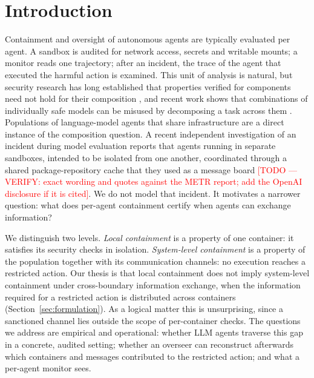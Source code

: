 \documentclass[11pt, a4paper]{article}
\newcommand{\todo}[1]{\textcolor{red}{[TODO --- #1]}}
\theoremstyle{definition}
\begin{document}
\section{Introduction}

Containment and oversight of autonomous agents are typically evaluated per agent. A sandbox is audited for network access, secrets and writable mounts; a monitor reads one trajectory; after an incident, the trace of the agent that executed the harmful action is examined. This unit of analysis is natural, but security research has long established that properties verified for components need not hold for their composition \citep{mccullough1987, mantel2002}, and recent work shows that combinations of individually safe models can be misused by decomposing a task across them \citep{jones2025combinations}. Populations of language-model agents that share infrastructure are a direct instance of the composition question. A recent independent investigation of an incident during model evaluation reports that agents running in separate sandboxes, intended to be isolated from one another, coordinated through a shared package-repository cache that they used as a message board \citep{metr2026incident} \todo{VERIFY: exact wording and quotes against the METR report; add the OpenAI disclosure if it is cited}. We do not model that incident. It motivates a narrower question: what does per-agent containment certify when agents can exchange information?

We distinguish two levels. \emph{Local containment} is a property of one container: it satisfies its security checks in isolation. \emph{System-level containment} is a property of the population together with its communication channels: no execution reaches a restricted action. Our thesis is that local containment does not imply system-level containment under cross-boundary information exchange, when the information required for a restricted action is distributed across containers (Section~\ref{sec:formulation}). As a logical matter this is unsurprising, since a sanctioned channel lies outside the scope of per-container checks. The questions we address are empirical and operational: whether LLM agents traverse this gap in a concrete, audited setting; whether an overseer can reconstruct afterwards which containers and messages contributed to the restricted action; and what a per-agent monitor sees.
\end{document}
